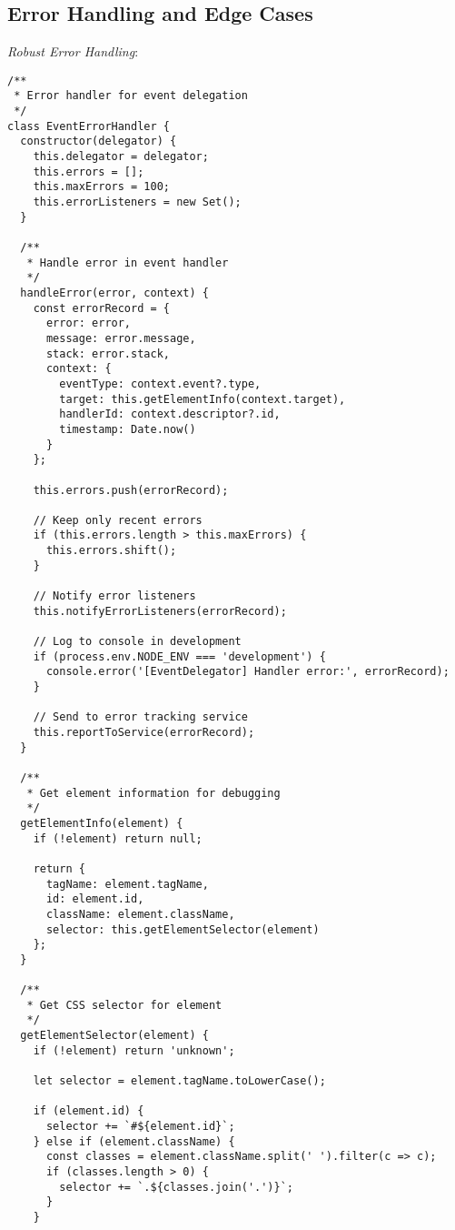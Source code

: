 \documentclass[11pt]{article}
\begin{document}
\subsection{Error Handling and Edge Cases}
\label{sec:org6552cba}

\emph{Robust Error Handling}:

\begin{verbatim}
/**
 * Error handler for event delegation
 */
class EventErrorHandler {
  constructor(delegator) {
    this.delegator = delegator;
    this.errors = [];
    this.maxErrors = 100;
    this.errorListeners = new Set();
  }
  
  /**
   * Handle error in event handler
   */
  handleError(error, context) {
    const errorRecord = {
      error: error,
      message: error.message,
      stack: error.stack,
      context: {
        eventType: context.event?.type,
        target: this.getElementInfo(context.target),
        handlerId: context.descriptor?.id,
        timestamp: Date.now()
      }
    };
    
    this.errors.push(errorRecord);
    
    // Keep only recent errors
    if (this.errors.length > this.maxErrors) {
      this.errors.shift();
    }
    
    // Notify error listeners
    this.notifyErrorListeners(errorRecord);
    
    // Log to console in development
    if (process.env.NODE_ENV === 'development') {
      console.error('[EventDelegator] Handler error:', errorRecord);
    }
    
    // Send to error tracking service
    this.reportToService(errorRecord);
  }
  
  /**
   * Get element information for debugging
   */
  getElementInfo(element) {
    if (!element) return null;
    
    return {
      tagName: element.tagName,
      id: element.id,
      className: element.className,
      selector: this.getElementSelector(element)
    };
  }
  
  /**
   * Get CSS selector for element
   */
  getElementSelector(element) {
    if (!element) return 'unknown';
    
    let selector = element.tagName.toLowerCase();
    
    if (element.id) {
      selector += `#${element.id}`;
    } else if (element.className) {
      const classes = element.className.split(' ').filter(c => c);
      if (classes.length > 0) {
        selector += `.${classes.join('.')}`;
      }
    }
    

\end{verbatim}
\end{document}
